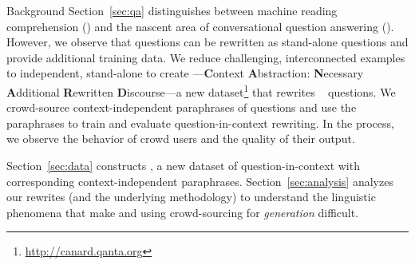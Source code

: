 Background Section~\ref{sec:qa} distinguishes between machine reading comprehension () and the nascent area of conversational question answering ().  
%
However, we observe that  questions can be rewritten as stand-alone  questions and provide additional training data.  
%
We reduce challenging, interconnected  examples to
independent, stand-alone  to create
\name{}---\textbf{C}ontext \textbf{A}bstraction: \textbf{N}ecessary
\textbf{A}dditional \textbf{R}ewritten \textbf{D}iscourse---a new
dataset\footnote{\url{http://canard.qanta.org}} that rewrites
\abr{\quac}~\citep{choi2018quac} questions.
%
We crowd-source context-independent paraphrases of \abr{\quac}
questions and use the paraphrases to train and evaluate
question-in-context rewriting.
%
In the process, we observe the behavior of crowd users and the quality of their output.  


%


Section~\ref{sec:data} constructs \name{}, a new dataset of
question-in-context with corresponding context-independent
paraphrases.
%
Section~\ref{sec:analysis} analyzes our rewrites (and the underlying
methodology) to understand the linguistic phenomena that make
 and using crowd-sourcing for \textit{generation} difficult.


